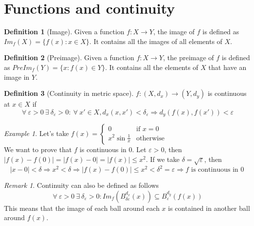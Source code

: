 \documentclass{article}
\newcommand{\DS}{\displaystyle}
\newcommand{\abs}[1]{\left|#1\right|}
\newcommand{\Ar}{\Rightarrow}
\newcommand{\fr}[2]{\frac{#1}{#2}}
\newcommand{\f}[3]{#1 : #2 \rightarrow #3}
\theoremstyle{definition}
\newtheorem{definition}{Definition}[section]
\theoremstyle{definition}
\theoremstyle{plain}
\theoremstyle{plain}
\theoremstyle{plain}
\theoremstyle{plain}
\theoremstyle{definition}
\theoremstyle{remark}
\newtheorem{exampled}{Example}[definition]
\theoremstyle{remark}
\theoremstyle{remark}
\theoremstyle{remark}
\newtheorem*{remark}{Remark}
\newcommand{\ForAll}{\ \forall \ }
\newcommand{\Exists}{\ \exists \ }
\newcommand{\E}{\varepsilon}
\begin{document}
\section{Functions and continuity}


\begin{definition}[Image]
  Given a function $\f{f}{X}{Y}$, the image of $f$ is defined as $Im_f(X) = \{ f(x) : x \in X \}$. It contains all the images of all elements of $X$.
\end{definition}


\begin{definition}[Preimage]
  Given a function $\f{f}{X}{Y}$, the preimage of $f$ is defined as $PreIm_f(Y) = \{ x : f(x) \in Y \}$. It contains all the elements of $X$ that have an image in $Y$.
\end{definition}


\begin{definition}[Continuity in metric space]
  $\f{f}{(X,d_x)}{(Y,d_y)}$ is continuous at $x \in X$ if
  \[
    \ForAll \E > 0 \Exists \delta_\E > 0 : \ForAll x' \in X,
    d_x(x,x') < \delta_\E \Ar d_y(f(x),f(x')) < \E
  \]
\end{definition}

\begin{exampled}
  Let's take $\DS f(x) = \begin{cases} 0 & \text{if } x = 0 \\ x^2 \sin\fr{1}{x} & \text{otherwise} \end{cases}$\\
  We want to prove that $f$ is continuous in 0. Let $\E > 0$, then $\abs{f(x) - f(0)} = \abs{f(x) - 0} = \abs{f(x)} \leq x^2$. If we take $\delta = \sqrt{\E}$, then
  \[
    \abs{x - 0} < \delta \Ar x^2 < \delta \Ar \abs{f(x) - f(0)}
    \leq x^2 < \delta^2 = \E \Ar f \text{ is continuous in 0}
  \]
\end{exampled}

\begin{remark}
  Continuity can also be defined as follows
  \[
    \ForAll \E > 0 \Exists \delta_\E > 0 :
    Im_f(B_{\delta\E}^{d_x}(x)) \subseteq B_\E^{d_y}(f(x))
  \]
  This means that the image of each ball around each $x$ is contained in another ball around $f(x)$.
\end{remark}
\end{document}
